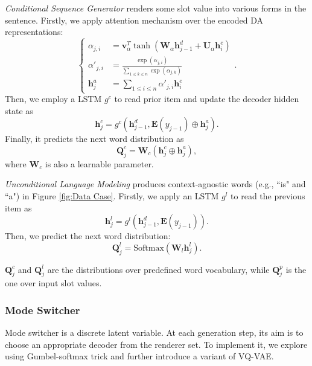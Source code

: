\documentclass[letterpaper]{article} %
\begin{document}
	\textit{Conditional Sequence Generator} renders some slot value into various forms in the sentence. Firstly, we apply attention mechanism over the encoded DA representations:
	\begin{equation}
	\left\{\begin{aligned}
	\alpha_{j,i} & = \mathbf{v}^T_{\alpha} \tanh(\mathbf{W}_{\alpha} \mathbf{h}^d_{j - 1} + \mathbf{U}_{\alpha}\mathbf{h}^e_i) \\
	\alpha'_{j,i} & = \frac{\exp(\alpha_{j,i})}{\sum_{1 \le k \le n} \exp(\alpha_{j,k})} \\
	\mathbf{h}^a_j & = \sum_{1 \le i \le n} \alpha'_{j,i} \mathbf{h}_i^e
	\end{aligned}\right..
	\end{equation} 	
	Then, we employ a LSTM $g^c$ to read prior item and update the decoder hidden state as
	\begin{equation}
	\mathbf{h}_j^c = g^c(\mathbf{h}_{j-1}^d, \mathbf{E}(y_{j-1}) \oplus \mathbf{h}^a_j).
	\end{equation}  
	Finally, it predicts the next word distribution as
	\begin{equation}
	\mathbf{Q}_j^c = \mathbf{W}_{c} (\mathbf{h}^c_j \oplus \mathbf{h}^a_j),
	\end{equation}
	where $\mathbf{W}_{c}$ is also a learnable parameter.
	
	\textit{Unconditional Language Modeling} produces context-agnostic words (e.g., ``is" and ``a") in Figure \ref{fig:Data Case}. Firstly, we apply an LSTM $g^l$ to read the previous item as 
	\begin{equation}
	\mathbf{h}_j^l = g^l(\mathbf{h}_{j-1}^d, \mathbf{E}(y_{j-1})).
	\end{equation}
	Then, we predict the next word distribution:
	\begin{equation}
	\mathbf{Q}^l_j = \mathrm{Softmax}(\mathbf{W}_l \mathbf{h}_j^l).
	\end{equation}
	
	$\mathbf{Q}^c_j$ and $\mathbf{Q}^l_j$ are the distributions over predefined word vocabulary, while $\mathbf{Q}^p_j$ is the one over input slot values.
	
\subsubsection{Mode Switcher} 

	Mode switcher is a discrete latent variable. At each generation step, its aim is to choose an appropriate decoder from the renderer set. To implement it, we explore using Gumbel-softmax trick and further introduce a variant of VQ-VAE.
	
\end{document}
